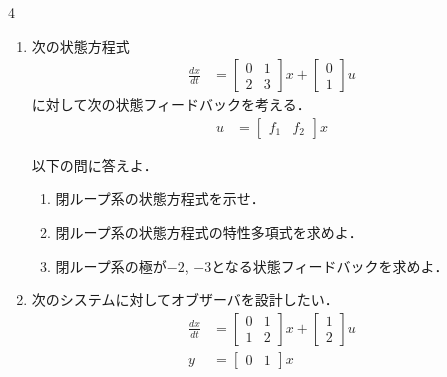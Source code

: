 \documentclass[fleqn]{article}
\renewcommand{\bmatrix}{\left[\begin{array}}
\newcommand{\ematrix}{\end{array}\right]}
\begin{document}
\begin{multicols}{4}
\begin{enumerate}

\item
次の状態方程式
\begin{align}
	\frac{dx}{dt} 
	& =	\bmatrix{rr}
			0 & 1 \\
			2 & 3
		\ematrix
		x
		+
		\bmatrix{c}
			0 \\
			1
		\ematrix
		u 
\nonumber
\end{align}
に対して次の状態フィードバックを考える．
\begin{align}
	u & = \bmatrix{cc} f_1 & f_2 \ematrix x
\nonumber
\end{align}

以下の問に答えよ．
\begin{enumerate}
\item
閉ループ系の状態方程式を示せ．
\vspace{6cm}

\item
閉ループ系の状態方程式の特性多項式を求めよ．
\vspace{6cm}

\item
閉ループ系の極が$-2$, $-3$となる状態フィードバックを求めよ．
\vspace{9cm}

\end{enumerate}
\vfill\null
\columnbreak






\item
次のシステムに対してオブザーバを設計したい．
\begin{align}
	\frac{dx}{dt}
	&=	\bmatrix{cc}
			0 & 1 \\
			1 & 2
		\ematrix
		x
		+
		\bmatrix{c}
			1 \\
			2
		\ematrix
		u
\nonumber \\
	y 
	&=	\bmatrix{cc}
			0 & 1 
		\ematrix
		x
\nonumber 
\end{align}


\end{enumerate}
\end{multicols}
\end{document}
